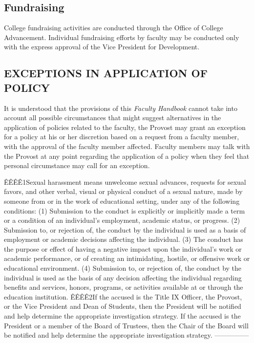 \documentclass[letterpaper, 11pt]{article}
\begin{document}
	\subsection{Fundraising}
		College fundraising activities are conducted through the Office of College Advancement.  Individual fundraising efforts by faculty may be conducted only with the express approval of the Vice President for Development.

	\subsection{EXCEPTIONS IN APPLICATION OF POLICY}
		It is understood that the provisions of this \emph{Faculty Handbook} cannot take into account all possible circumstances that might suggest alternatives in the application of policies related to the faculty, the Provost may grant an exception for a policy at his or her discretion based on a request from a faculty member, with the approval of the faculty member affected.  Faculty members may talk with the Provost at any point regarding the application of a policy when they feel that personal circumstance may call for an exception.





		ÊÊÊÊ1Sexual harassment means unwelcome sexual advances, requests for sexual favors, and other verbal, visual or physical conduct of a sexual nature, made by someone from or in the work of educational setting, under any of the following conditions:
		(1)  Submission to the conduct is explicitly or implicitly made a term or a condition of an individual's employment, academic status, or progress.
		(2)  Submission to, or rejection of, the conduct by the individual is used as a basis of employment or academic decisions affecting the individual.
		(3)  The conduct has the purpose or effect of having a negative impact upon the individual's work or academic performance, or of creating an intimidating, hostile, or offensive work or educational environment.
		(4)  Submission to, or rejection of, the conduct by the individual is used as the basis of any decision affecting the individual regarding benefits and services, honors, programs, or activities available at or through the education institution.
		ÊÊÊÊ2If the accused is the Title IX Officer, the Provost, or the Vice President and Dean of Students, then the President will be notified and help determine the appropriate investigation strategy.  If the accused is the President or a member of the Board of Trustees, then the Chair of the Board will be notified and help determine the appropriate investigation strategy.
		---------------
\end{document}
